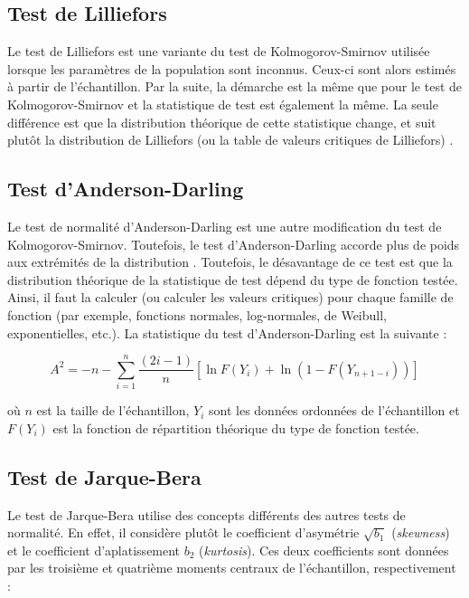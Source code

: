 \documentclass{article}       %
\begin{document}
\subsection{Test de Lilliefors}
\label{Sec:LL}

Le test de Lilliefors est une variante du test de Kolmogorov-Smirnov utilisée lorsque les paramètres de la population sont inconnus. Ceux-ci sont alors estimés à partir de l'échantillon. Par la suite, la démarche est la même que pour le test de Kolmogorov-Smirnov et la statistique de test est également la même. La seule différence est que la distribution théorique de cette statistique change, et suit plutôt la distribution de Lilliefors (ou la table de valeurs critiques de Lilliefors) \cite{LL}.

\subsection{Test d'Anderson-Darling}

Le test de normalité d'Anderson-Darling est une autre modification du test de Kolmogorov-Smirnov. Toutefois, le test d'Anderson-Darling accorde plus de poids aux extrémités de la distribution \cite{AD}. Toutefois, le désavantage de ce test est que la distribution théorique de la statistique de test dépend du type de fonction testée. Ainsi, il faut la calculer (ou calculer les valeurs critiques) pour chaque famille de fonction (par exemple, fonctions normales, log-normales, de Weibull, exponentielles, etc.). La statistique du test d'Anderson-Darling est la suivante \cite{AD}:

\begin{equation*}
    A^{2} = -n - \sum^{n}_{i=1}\frac{(2i-1)}{n}\left[\ln F(Y_{i})+\ln (1-F(Y_{n+1-i}))\right]
\end{equation*}

où $n$ est la taille de l'échantillon, $Y_{i}$ sont les données ordonnées de l'échantillon et $F(Y_{i})$ est la fonction de répartition théorique du type de fonction testée.

\subsection{Test de Jarque-Bera}
\label{Sec:JB}

Le test de Jarque-Bera utilise des concepts différents des autres tests de normalité. En effet, il considère plutôt le coefficient d'asymétrie $\sqrt{b_{1}}$ (\textit{skewness}) et le coefficient d'aplatissement $b_{2}$ (\textit{kurtosis}). Ces deux coefficients sont données par les troisième et quatrième moments centraux de l'échantillon, respectivement \cite{JBWiki}:
\end{document}
